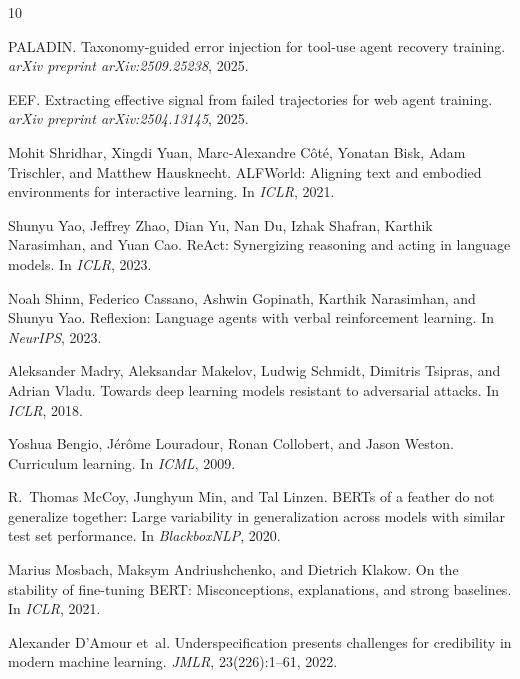 \documentclass[11pt,a4paper]{article}
\begin{document}

\begin{thebibliography}{10}

PALADIN.
\newblock Taxonomy-guided error injection for tool-use agent recovery training.
\newblock \emph{arXiv preprint arXiv:2509.25238}, 2025.

EEF.
\newblock Extracting effective signal from failed trajectories for web agent training.
\newblock \emph{arXiv preprint arXiv:2504.13145}, 2025.

Mohit Shridhar, Xingdi Yuan, Marc-Alexandre C\^{o}t\'{e}, Yonatan Bisk, Adam Trischler, and Matthew Hausknecht.
\newblock ALFWorld: Aligning text and embodied environments for interactive learning.
\newblock In \emph{ICLR}, 2021.

Shunyu Yao, Jeffrey Zhao, Dian Yu, Nan Du, Izhak Shafran, Karthik Narasimhan, and Yuan Cao.
\newblock ReAct: Synergizing reasoning and acting in language models.
\newblock In \emph{ICLR}, 2023.

Noah Shinn, Federico Cassano, Ashwin Gopinath, Karthik Narasimhan, and Shunyu Yao.
\newblock Reflexion: Language agents with verbal reinforcement learning.
\newblock In \emph{NeurIPS}, 2023.

Aleksander Madry, Aleksandar Makelov, Ludwig Schmidt, Dimitris Tsipras, and Adrian Vladu.
\newblock Towards deep learning models resistant to adversarial attacks.
\newblock In \emph{ICLR}, 2018.

Yoshua Bengio, J\'{e}r\^{o}me Louradour, Ronan Collobert, and Jason Weston.
\newblock Curriculum learning.
\newblock In \emph{ICML}, 2009.

R.~Thomas McCoy, Junghyun Min, and Tal Linzen.
\newblock BERTs of a feather do not generalize together: Large variability in generalization across models with similar test set performance.
\newblock In \emph{BlackboxNLP}, 2020.

Marius Mosbach, Maksym Andriushchenko, and Dietrich Klakow.
\newblock On the stability of fine-tuning BERT: Misconceptions, explanations, and strong baselines.
\newblock In \emph{ICLR}, 2021.

Alexander D'Amour et~al.
\newblock Underspecification presents challenges for credibility in modern machine learning.
\newblock \emph{JMLR}, 23(226):1--61, 2022.

\end{thebibliography}
\end{document}
